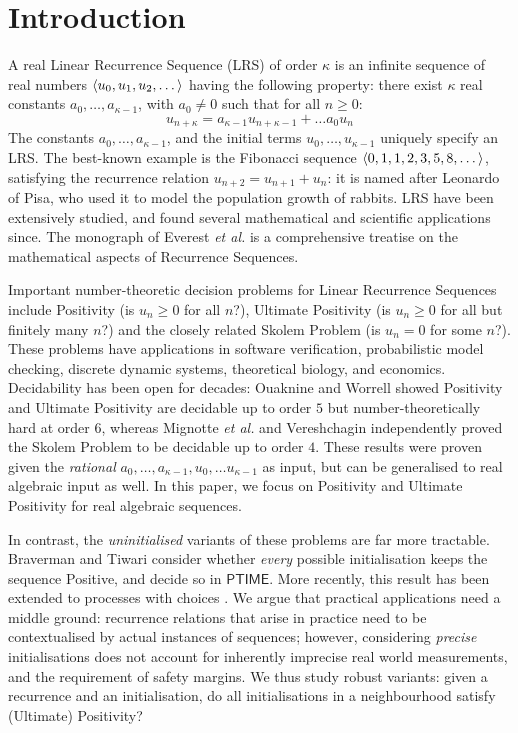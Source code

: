 \section{Introduction}
\label{section:intro}
A real Linear Recurrence Sequence (LRS) of order $\kappa$ is an infinite sequence of real numbers $\langle u_0, u_1, u_2, \dots\rangle$ having the following property: there exist $\kappa$ real constants $a_{0}, \dots, a_{\kappa-1}$, with $a_0 \ne 0$ such that for all $n \ge 0$:
\begin{equation}
u_{n+\kappa} = a_{\kappa-1}u_{n+\kappa-1} + \dots a_0 u_n
\end{equation}
The constants $a_0, \dots, a_{\kappa-1}$, and the initial terms $u_0, \dots, u_{\kappa-1}$ uniquely specify an LRS. The best-known example is the Fibonacci sequence $\langle0, 1, 1, 2, 3, 5, 8, \dots\rangle$, satisfying the recurrence relation $u_{n+2} = u_{n+1} + u_n$: it is named after Leonardo of Pisa, who used it to model the population growth of rabbits. LRS have been extensively studied, and found several mathematical and scientific applications since. The monograph of Everest \textit{et al.} \cite{Everest2003RecurrenceS} is a comprehensive treatise on the mathematical aspects of Recurrence Sequences.

Important number-theoretic decision problems for Linear Recurrence Sequences include Positivity (is $u_n \ge 0$ for all $n$?), Ultimate Positivity (is $u_n \ge 0$ for all but finitely many $n$?) and the closely related Skolem Problem (is $u_n = 0$ for some $n$?). These problems have applications in software verification, probabilistic model checking, discrete dynamic systems, theoretical biology, and economics. Decidability has been open for decades: Ouaknine and Worrell \cite{joeljames3} showed Positivity and Ultimate Positivity are decidable up to order $5$ but number-theoretically hard at order $6$, whereas Mignotte \textit{et al.} \cite{mignotte} and Vereshchagin \cite{vereshchagin} independently proved the Skolem Problem to be decidable up to order $4$. These results were proven given the \textit{rational} $a_0, \dots, a_{\kappa-1}, u_0, \dots u_{\kappa-1}$ as input, but can be generalised to real algebraic input as well. In this paper, we focus on Positivity and Ultimate Positivity for real algebraic sequences.

In contrast, the \textit{uninitialised} variants of these problems are far more tractable. Braverman \cite{Braverman06} and Tiwari \cite{Tiwari04} consider whether \textit{every} possible initialisation keeps the sequence Positive, and decide so in $\mathsf{PTIME}$. More recently, this result has been extended to processes with choices \cite{AGV18}. We argue that practical applications need a middle ground: recurrence relations that arise in practice need to be contextualised by actual instances of sequences; however, considering \textit{precise} initialisations does not account for inherently imprecise real world measurements, and the requirement of safety margins. We thus study robust variants: given a recurrence and an initialisation, do all initialisations in a neighbourhood satisfy (Ultimate) Positivity?

